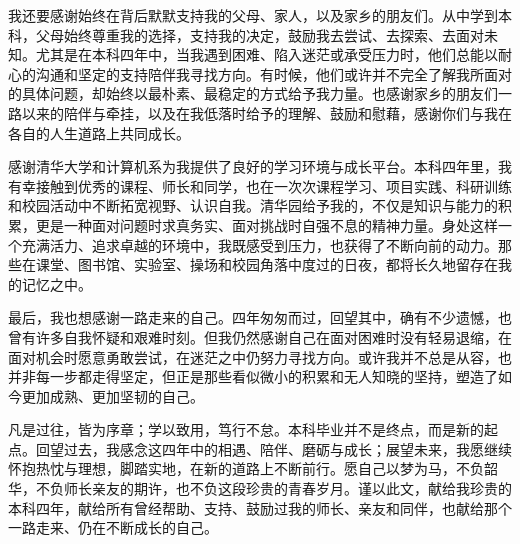 \begin{acknowledgements}
  我还要感谢始终在背后默默支持我的父母、家人，以及家乡的朋友们。从中学到本科，父母始终尊重我的选择，支持我的决定，鼓励我去尝试、去探索、去面对未知。尤其是在本科四年中，当我遇到困难、陷入迷茫或承受压力时，他们总能以耐心的沟通和坚定的支持陪伴我寻找方向。有时候，他们或许并不完全了解我所面对的具体问题，却始终以最朴素、最稳定的方式给予我力量。也感谢家乡的朋友们一路以来的陪伴与牵挂，以及在我低落时给予的理解、鼓励和慰藉，感谢你们与我在各自的人生道路上共同成长。

  感谢清华大学和计算机系为我提供了良好的学习环境与成长平台。本科四年里，我有幸接触到优秀的课程、师长和同学，也在一次次课程学习、项目实践、科研训练和校园活动中不断拓宽视野、认识自我。清华园给予我的，不仅是知识与能力的积累，更是一种面对问题时求真务实、面对挑战时自强不息的精神力量。身处这样一个充满活力、追求卓越的环境中，我既感受到压力，也获得了不断向前的动力。那些在课堂、图书馆、实验室、操场和校园角落中度过的日夜，都将长久地留存在我的记忆之中。

  最后，我也想感谢一路走来的自己。四年匆匆而过，回望其中，确有不少遗憾，也曾有许多自我怀疑和艰难时刻。但我仍然感谢自己在面对困难时没有轻易退缩，在面对机会时愿意勇敢尝试，在迷茫之中仍努力寻找方向。或许我并不总是从容，也并非每一步都走得坚定，但正是那些看似微小的积累和无人知晓的坚持，塑造了如今更加成熟、更加坚韧的自己。

  凡是过往，皆为序章；学以致用，笃行不怠。本科毕业并不是终点，而是新的起点。回望过去，我感念这四年中的相遇、陪伴、磨砺与成长；展望未来，我愿继续怀抱热忱与理想，脚踏实地，在新的道路上不断前行。愿自己以梦为马，不负韶华，不负师长亲友的期许，也不负这段珍贵的青春岁月。谨以此文，献给我珍贵的本科四年，献给所有曾经帮助、支持、鼓励过我的师长、亲友和同伴，也献给那个一路走来、仍在不断成长的自己。
\end{acknowledgements}
